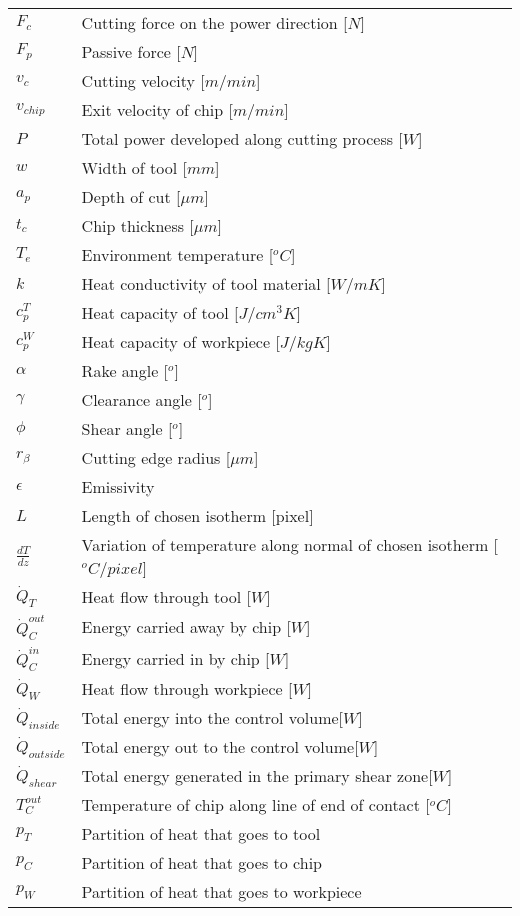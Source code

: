 \begin{longtable}{ll}
$F_{c}$ & Cutting force on the power direction [$N$]\\
$F_{p}$ & Passive force [$N$]\\
$v_{c}$ & Cutting velocity [$m/min$]\\
$v_{chip}$ & Exit velocity of chip [$m/min$]\\
$P$ & Total power developed along cutting process [$W$]\\
$w$ & Width of tool [$mm$]\\
$a_{p}$ & Depth of cut [$\mu$$m$]\\
$t_{c}$ & Chip thickness [$\mu$$m$]\\
$T_{e}$ & Environment temperature [$^{o}C$]\\
$k$ & Heat conductivity of tool material [$W/mK$]\\
$c_{p}^{T}$ & Heat capacity of tool [$J/cm^{3}K$]\\
$c_{p}^{W}$ & Heat capacity of workpiece [$J/kgK$]\\
$\alpha$ & Rake angle [$^{o}$]\\
$\gamma$ & Clearance angle [$^{o}$]\\
$\phi$ & Shear angle [$^{o}$]\\
$r_{\beta}$ & Cutting edge radius [$\mu$$m$]\\
$\epsilon$ & Emissivity\\
$L$ & Length of chosen isotherm [pixel]\\
$\frac{dT}{dz}$ & Variation of temperature along normal of chosen isotherm [$^{o}C/pixel$]\\
$\dot{Q}_{T}$ & Heat flow through tool [$W$]\\
$\dot{Q}_{C}^{out}$ & Energy carried away by chip [$W$]\\
$\dot{Q}_{C}^{in}$ & Energy carried in by chip [$W$]\\
$\dot{Q}_{W}$ & Heat flow through workpiece [$W$]\\
$\dot{Q}_{inside}$ & Total energy into the control volume[$W$]\\
$\dot{Q}_{outside}$ & Total energy out to the control volume[$W$]\\
$\dot{Q}_{shear}$ & Total energy generated in the primary shear zone[$W$]\\
${T}_{C}^{out}$ & Temperature of chip along line of end of contact [$^{o}C$]\\
$p_{T}$ & Partition of heat that goes to tool\\
$p_{C}$ & Partition of heat that goes to chip\\
$p_{W}$ & Partition of heat that goes to workpiece\\
\end{longtable}

